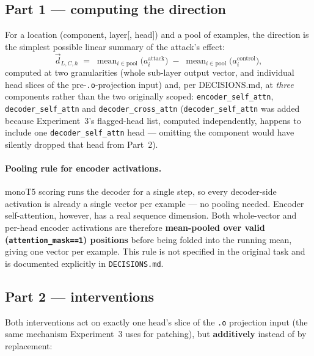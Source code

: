 \documentclass[11pt]{article}
\newcommand{\dirvec}{\ensuremath{\vec{d}}}
\begin{document}
\subsection{Part 1 --- computing the direction}

For a location (component, layer[, head]) and a pool of examples, the
direction is the simplest possible linear summary of the attack's effect:
\begin{equation}
\dirvec_{L,C,h} \;=\; \operatorname{mean}_{i \in \text{pool}}\big(a^{\text{attack}}_{i}\big)
                    \;-\; \operatorname{mean}_{i \in \text{pool}}\big(a^{\text{control}}_{i}\big),
\label{eq:direction}
\end{equation}
computed at two granularities (whole sub-layer output vector, and individual
head slices of the pre-\texttt{.o}-projection input) and, per DECISIONS.md,
at \emph{three} components rather than the two originally scoped:
\texttt{encoder\_self\_attn}, \texttt{decoder\_self\_attn} and
\texttt{decoder\_cross\_attn} (\texttt{decoder\_self\_attn} was added because
Experiment~3's flagged-head list, computed independently, happens to include
one \texttt{decoder\_self\_attn} head --- omitting the component would have
silently dropped that head from Part~2).

\paragraph{Pooling rule for encoder activations.} monoT5 scoring runs the
decoder for a single step, so every decoder-side activation is already a
single vector per example --- no pooling needed. Encoder self-attention,
however, has a real sequence dimension. Both whole-vector and per-head
encoder activations are therefore \textbf{mean-pooled over valid
(\texttt{attention\_mask==1}) positions} before being folded into the
running mean, giving one vector per example. This rule is not specified in
the original task and is documented explicitly in \texttt{DECISIONS.md}.

\subsection{Part 2 --- interventions}

Both interventions act on exactly one head's slice of the \texttt{.o}
projection input (the same mechanism Experiment~3 uses for patching), but
\textbf{additively} instead of by replacement:
\end{document}
